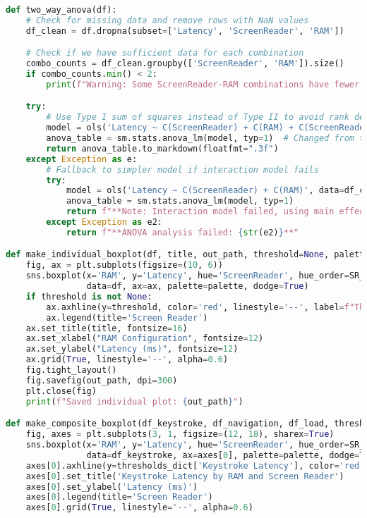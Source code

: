 \begin{lstlisting}[language=python]
def two_way_anova(df):
    # Check for missing data and remove rows with NaN values
    df_clean = df.dropna(subset=['Latency', 'ScreenReader', 'RAM'])

    # Check if we have sufficient data for each combination
    combo_counts = df_clean.groupby(['ScreenReader', 'RAM']).size()
    if combo_counts.min() < 2:
        print(f"Warning: Some ScreenReader-RAM combinations have fewer than 2 observations")

    try:
        # Use Type I sum of squares instead of Type II to avoid rank deficiency issues
        model = ols('Latency ~ C(ScreenReader) + C(RAM) + C(ScreenReader):C(RAM)', data=df_clean).fit()
        anova_table = sm.stats.anova_lm(model, typ=1)  # Changed from typ=2 to typ=1
        return anova_table.to_markdown(floatfmt=".3f")
    except Exception as e:
        # Fallback to simpler model if interaction model fails
        try:
            model = ols('Latency ~ C(ScreenReader) + C(RAM)', data=df_clean).fit()
            anova_table = sm.stats.anova_lm(model, typ=1)
            return f"**Note: Interaction model failed, using main effects only**\n\n{anova_table.to_markdown(floatfmt='.3f')}"
        except Exception as e2:
            return f"**ANOVA analysis failed: {str(e2)}**"

def make_individual_boxplot(df, title, out_path, threshold=None, palette=None):
    fig, ax = plt.subplots(figsize=(10, 6))
    sns.boxplot(x='RAM', y='Latency', hue='ScreenReader', hue_order=SR_ORDER,
                data=df, ax=ax, palette=palette, dodge=True)
    if threshold is not None:
        ax.axhline(y=threshold, color='red', linestyle='--', label=f"Threshold ({threshold}ms)")
        ax.legend(title='Screen Reader')
    ax.set_title(title, fontsize=16)
    ax.set_xlabel("RAM Configuration", fontsize=12)
    ax.set_ylabel("Latency (ms)", fontsize=12)
    ax.grid(True, linestyle='--', alpha=0.6)
    fig.tight_layout()
    fig.savefig(out_path, dpi=300)
    plt.close(fig)
    print(f"Saved individual plot: {out_path}")

def make_composite_boxplot(df_keystroke, df_navigation, df_load, thresholds_dict, out_path, palette=None):
    fig, axes = plt.subplots(3, 1, figsize=(12, 18), sharex=True)
    sns.boxplot(x='RAM', y='Latency', hue='ScreenReader', hue_order=SR_ORDER,
                data=df_keystroke, ax=axes[0], palette=palette, dodge=True)
    axes[0].axhline(y=thresholds_dict['Keystroke Latency'], color='red', linestyle='--')
    axes[0].set_title('Keystroke Latency by RAM and Screen Reader')
    axes[0].set_ylabel('Latency (ms)')
    axes[0].legend(title='Screen Reader')
    axes[0].grid(True, linestyle='--', alpha=0.6)


\end{lstlisting}
